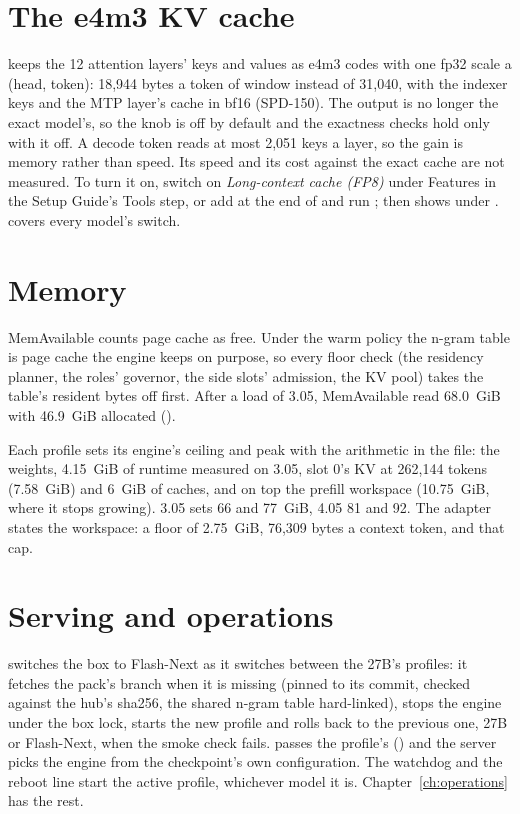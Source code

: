 \section{The e4m3 KV cache}\label{sec:fn-kvfp8}

 keeps the 12 attention layers' keys and values as e4m3 codes with one fp32 scale a (head, token): 18,944 bytes a token of window instead of 31,040, with the indexer keys and the MTP layer's cache in bf16 (SPD-150). The output is no longer the exact model's, so the knob is off by default and the exactness checks hold only with it off. A decode token reads at most 2,051 keys a layer, so the gain is memory rather than speed. Its speed and its cost against the exact cache are not measured. To turn it on, switch on \emph{Long-context cache (FP8)} under Features in the Setup Guide's Tools step, or add  at the end of  and run ;  then shows  under .  covers every model's switch.

\section{Memory}

MemAvailable counts page cache as free. Under the warm policy the n-gram table is page cache the engine keeps on purpose, so every floor check (the residency planner, the roles' governor, the side slots' admission, the KV pool) takes the table's resident bytes off first. After a load of 3.05, MemAvailable read 68.0~GiB with 46.9~GiB allocated (\measured).

Each profile sets its engine's ceiling and peak with the arithmetic in the file: the weights, 4.15~GiB of runtime measured on 3.05, slot 0's KV at 262,144 tokens (7.58~GiB) and 6~GiB of caches, and on top the prefill workspace (10.75~GiB, where it stops growing). 3.05 sets 66 and 77~GiB, 4.05 81 and 92. The adapter states the workspace: a floor of 2.75~GiB, 76,309 bytes a context token, and that cap.

\section{Serving and operations}

 switches the box to Flash-Next as it switches between the 27B's profiles: it fetches the pack's branch when it is missing (pinned to its commit, checked against the hub's sha256, the shared n-gram table hard-linked), stops the engine under the box lock, starts the new profile and rolls back to the previous one, 27B or Flash-Next, when the smoke check fails.  passes the profile's  () and the server picks the engine from the checkpoint's own configuration. The watchdog and the reboot line start the active profile, whichever model it is. Chapter~\ref{ch:operations} has the rest.

